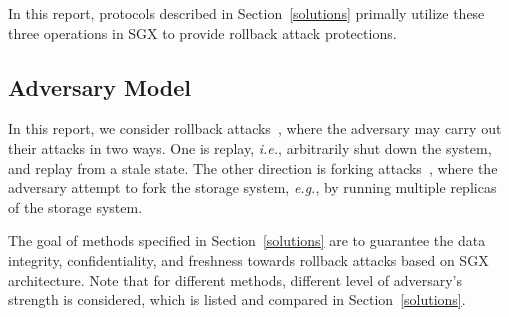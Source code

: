 In this report, protocols described in Section~\ref{solutions} primally utilize these three operations in SGX to provide rollback attack protections.


\subsection{Adversary Model}
In this report, we consider rollback attacks~\cite{}, where the adversary may carry out their attacks in two ways. One is replay, \textit{i.e.}, arbitrarily shut down the system, and replay from a stale state. The other direction is forking attacks~\cite{}, where the adversary attempt to fork the storage system, \textit{e.g.}, by running multiple replicas of the storage system.

The goal of methods specified in Section~\ref{solutions} are to guarantee the data integrity, confidentiality, and freshness towards rollback attacks based on SGX architecture. Note that for different methods, different level of adversary's strength is considered, which is listed and compared in Section~\ref{solutions}.




